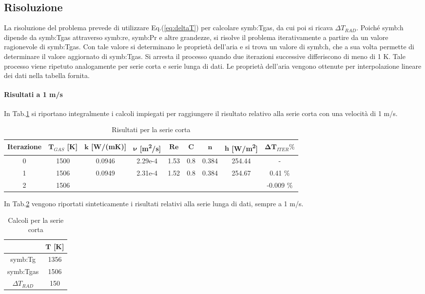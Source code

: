 \subsection{Risoluzione}
La risoluzione del problema prevede di utilizzare Eq.(\ref{eq:deltaT}) per calcolare \gls{symb:Tgas}, da cui poi si ricava $\Delta T_{\textit{RAD}}$. Poiché \gls{symb:h} dipende da \gls{symb:Tgas} attraverso \gls{symb:re}, \gls{symb:Pr} e altre grandezze, si risolve il problema iterativamente a partire da un valore ragionevole di \gls{symb:Tgas}. Con tale valore si determinano le proprietà dell'aria e si trova un valore di \gls{symb:h}, che a sua volta permette di determinare il valore aggiornato di \gls{symb:Tgas}. Si arresta il processo quando due iterazioni successive differiscono di meno di 1 K.
Tale processo viene ripetuto analogamente per serie corta e serie lunga di dati. 
Le proprietà dell'aria vengono ottenute per interpolazione lineare dei dati nella tabella fornita. 


\paragraph{Risultati a 1 m/s}
In Tab.\ref{tab:calcolishort1} si riportano integralmente i calcoli impiegati per raggiungere il risultato relativo alla serie corta con una velocità di 1 m/s. 

\begin{table}[H]
	\centering
	\begin{tabular}{c|c|c|c|c|c|c|c|c}
		\toprule
		\toprule
		\textbf{Iterazione} & $\bm{T_{\textit{GAS}}}$ [K]& $\bm{k}$ [W/(mK)] & $\bm{\nu}$ [m\textsuperscript{2}/s] & $\bm{Re}$ & $\bm{C}$ & $\bm{n}$ & $\bm{h}$ [W/m\textsuperscript{2}] & $\bm{\Delta T_{\textit{ITER}} \%}$\\
		\midrule
		\midrule
		0 & 1500 & 0.0946 & 2.29e-4 & 1.53 & 0.8 & 0.384 & 254.44 & - \\
		\midrule
		1 & 1506 & 0.0949 & 2.31e-4 & 1.52 & 0.8 & 0.384 & 254.67 & 0.41 \% \\
		\midrule
		2 & 1506 & & &  &  &  &  &  -0.009 \% \\
		\bottomrule
		\bottomrule	
	\end{tabular}
	\caption{Risultati per la serie corta}
	\label{tab:calcolishort1}
\end{table}

In Tab.\ref{tab:risultatishort1} vengono riportati sinteticamente i risultati relativi alla serie lunga di dati, sempre a 1 m/s.

\begin{table}[H]
	\centering
	\begin{tabular}{c|c}
		\toprule
		\toprule
		& $\bm{T}$ [K]\\
		\midrule
		\midrule
		\gls{symb:Tg} & 1356 \\
		\midrule
		\gls{symb:Tgas} & 1506 \\
		\midrule
		$\Delta T_{\textit{RAD}}$ & 150 \\
		\bottomrule
		\bottomrule	
	\end{tabular}
	\caption{Calcoli per la serie corta}
	\label{tab:risultatishort1}
\end{table}



